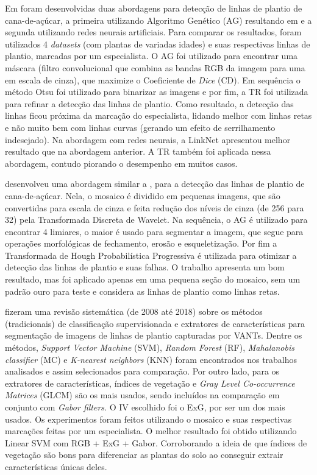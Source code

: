 \documentclass[12pt, a4paper, english, brazil]{article}
\begin{document}
Em  foram desenvolvidas duas abordagens para detecção de linhas de plantio de cana-de-açúcar, a primeira utilizando Algoritmo Genético (AG) resultando em  e a segunda utilizando redes neurais artificiais. Para comparar os resultados, foram utilizados 4 \textit{datasets} (com plantas de variadas idades) e suas respectivas linhas de plantio, marcadas por um especialista. O AG foi utilizado para encontrar uma máscara (filtro convolucional que combina as bandas RGB da imagem para uma em escala de cinza), que maximize o Coeficiente de \textit{Dice} (CD). Em sequência o método Otsu foi utilizado para binarizar as imagens e por fim, a TR foi utilizada para refinar a detecção das linhas de plantio. Como resultado, a detecção das linhas ficou próxima da marcação do especialista, lidando melhor com linhas retas e não muito bem com linhas curvas (gerando um efeito de serrilhamento indesejado). Na abordagem com redes neurais, a LinkNet apresentou melhor resultado que na abordagem anterior. A TR também foi aplicada nessa abordagem, contudo piorando o desempenho em muitos casos.

 desenvolveu uma abordagem similar a , para a detecção das linhas de plantio de cana-de-açúcar. Nela, o mosaico é dividido em pequenas imagens, que são convertidas para escala de cinza e feita redução dos níveis de cinza (de 256 para 32) pela Transformada Discreta de Wavelet. Na sequência, o AG é utilizado para encontrar 4 limiares, o maior é usado para segmentar a imagem, que segue para operações morfológicas de fechamento, erosão e esqueletização. Por fim a Transformada de Hough Probabilística Progressiva é utilizada para otimizar a detecção das linhas de plantio e suas falhas. O trabalho apresenta um bom resultado, mas foi aplicado apenas em uma pequena seção do mosaico, sem um padrão ouro para teste e considera as linhas de plantio como linhas retas.

 fizeram uma revisão sistemática (de 2008 até 2018) sobre os métodos (tradicionais) de classificação supervisionada e extratores de características para segmentação de imagens de linhas de plantio capturadas por VANTs. Dentre os métodos, \textit{Support Vector Machine} (SVM), \textit{Random Forest} (RF), \textit{Mahalanobis classifier} (MC) e \textit{K-nearest neighbors} (KNN) foram encontrados nos trabalhos analisados e assim selecionados para comparação. Por outro lado, para os extratores de características, índices de vegetação e \textit{Gray Level Co-occurrence Matrices} (GLCM) são os mais usados, sendo incluídos na comparação em conjunto com \textit{Gabor filters}. O IV escolhido foi o ExG, por ser um dos mais usados. Os experimentos foram feitos utilizando o mosaico \cite{CropRowsDataset2019} e suas respectivas marcações feitas por um especialista. O melhor resultado foi obtido utilizando Linear SVM com RGB + ExG + Gabor. Corroborando a ideia de que índices de vegetação são bons para diferenciar as plantas do solo ao conseguir extrair características únicas deles.
\end{document}
